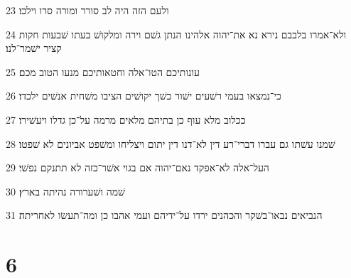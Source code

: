 \par 23 ולעם הזה היה לב סורר ומורה סרו וילכו׃
\par 24 ולא־אמרו בלבבם נירא נא את־יהוה אלהינו הנתן גשׁם וירה ומלקושׁ בעתו שׁבעות חקות קציר ישׁמר־לנו׃
\par 25 עונותיכם הטו־אלה וחטאותיכם מנעו הטוב מכם׃
\par 26 כי־נמצאו בעמי רשׁעים ישׁור כשׁך יקושׁים הציבו משׁחית אנשׁים ילכדו׃
\par 27 ככלוב מלא עוף כן בתיהם מלאים מרמה על־כן גדלו ויעשׁירו׃
\par 28 שׁמנו עשׁתו גם עברו דברי־רע דין לא־דנו דין יתום ויצליחו ומשׁפט אביונים לא שׁפטו׃
\par 29 העל־אלה לא־אפקד נאם־יהוה אם בגוי אשׁר־כזה לא תתנקם נפשׁי׃
\par 30 שׁמה ושׁערורה נהיתה בארץ׃
\par 31 הנביאים נבאו־בשׁקר והכהנים ירדו על־ידיהם ועמי אהבו כן ומה־תעשׂו לאחריתה׃

\chapter{6}

